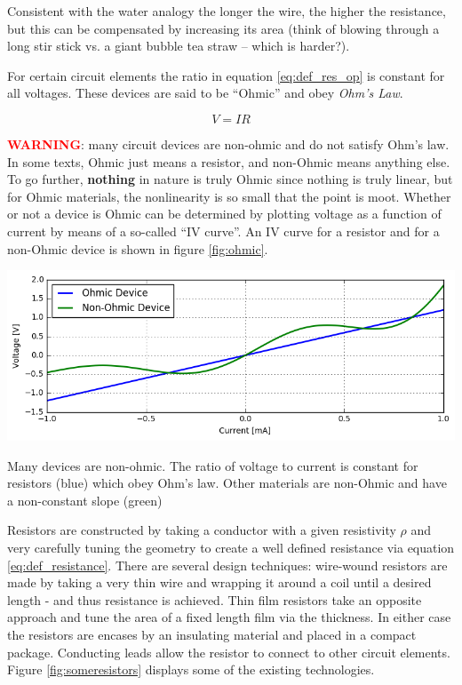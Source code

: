 \documentclass{tufte-book}
\begin{document}
Consistent with the water analogy the longer the wire, the higher the resistance, but this can be compensated by increasing its area (think of blowing through a long stir stick vs. a giant bubble tea straw -- which is harder?).

For certain circuit elements the ratio in equation \ref{eq:def_res_op} is constant for all voltages. These devices are said to be ``Ohmic'' and obey \textit{Ohm's Law}.

\begin{equation}\label{eq:ohmslaw}
  \boxed{V = IR}
\end{equation}

\noindent  \textcolor{red}{\textbf{WARNING}}: many circuit devices are non-ohmic and do not satisfy Ohm's law. In some texts, Ohmic just means a resistor, and non-Ohmic means anything else. To go further, \textbf{nothing} in nature is truly Ohmic since nothing is truly linear, but for Ohmic materials, the nonlinearity is so small that the point is moot. Whether or not a device is Ohmic can be determined by plotting voltage as a function of current by means of a so-called ``IV curve''. An IV curve for a resistor and for a non-Ohmic device is shown in figure \ref{fig:ohmic}.

\begin{marginfigure}%
  \includegraphics[width=\linewidth]{ohmicnonohmic}
\caption{Many devices are non-ohmic. The ratio of voltage to current is constant for resistors (blue) which obey Ohm's law. Other materials are non-Ohmic and have a non-constant slope (green) }
  \label{fig:ohmic}
\end{marginfigure}


Resistors are constructed by taking a conductor with a given resistivity $\rho$ and very carefully tuning the geometry to create a well defined resistance via equation \ref{eq:def_resistance}. There are several design techniques: wire-wound resistors are made by taking a very thin wire and wrapping it around a coil until a desired length - and thus resistance is achieved. Thin film resistors take an opposite approach and tune the area of a fixed length film via the thickness. In either case the resistors are encases by an insulating material and placed in a compact package. Conducting leads allow the resistor to connect to other circuit elements. Figure \ref{fig:someresistors} displays some of the existing technologies.
\end{document}
